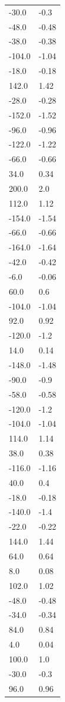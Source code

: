 \begin{longtable}{ll}
-30.0 & -0.3 \\
-48.0 & -0.48 \\
-38.0 & -0.38 \\
-104.0 & -1.04 \\
-18.0 & -0.18 \\
142.0 & 1.42 \\
-28.0 & -0.28 \\
-152.0 & -1.52 \\
-96.0 & -0.96 \\
-122.0 & -1.22 \\
-66.0 & -0.66 \\
34.0 & 0.34 \\
200.0 & 2.0 \\
112.0 & 1.12 \\
-154.0 & -1.54 \\
-66.0 & -0.66 \\
-164.0 & -1.64 \\
-42.0 & -0.42 \\
-6.0 & -0.06 \\
60.0 & 0.6 \\
-104.0 & -1.04 \\
92.0 & 0.92 \\
-120.0 & -1.2 \\
14.0 & 0.14 \\
-148.0 & -1.48 \\
-90.0 & -0.9 \\
-58.0 & -0.58 \\
-120.0 & -1.2 \\
-104.0 & -1.04 \\
114.0 & 1.14 \\
38.0 & 0.38 \\
-116.0 & -1.16 \\
40.0 & 0.4 \\
-18.0 & -0.18 \\
-140.0 & -1.4 \\
-22.0 & -0.22 \\
144.0 & 1.44 \\
64.0 & 0.64 \\
8.0 & 0.08 \\
102.0 & 1.02 \\
-48.0 & -0.48 \\
-34.0 & -0.34 \\
84.0 & 0.84 \\
4.0 & 0.04 \\
100.0 & 1.0 \\
-30.0 & -0.3 \\
96.0 & 0.96 \\

\end{longtable}
